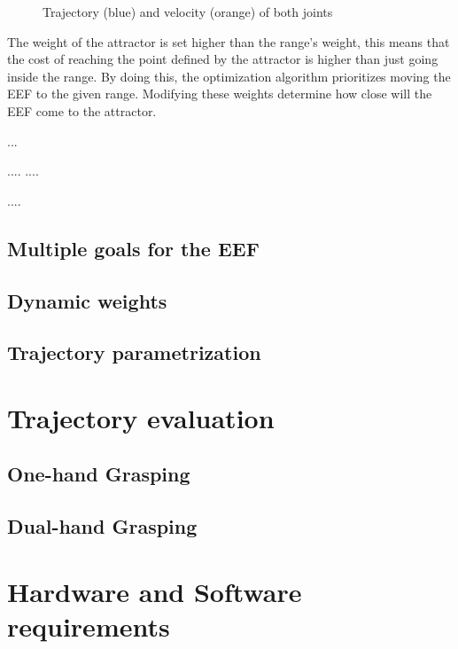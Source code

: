 \begin{figure}[H]
	\centering
	\begin{subfigure}[][Joint $q_{0}$]
		{\texttt{[image: controllers/range\_q0.png]}}
	\end{subfigure}
	\begin{subfigure}[][Joint $q_{1}$]
		{\texttt{[image: controllers/range\_q1.png]}}
	\end{subfigure}
	\vspace{-12pt}
	\caption[Position range with attractor: Joints]{Trajectory (blue) and velocity (orange) of both joints}
	\vspace{-10pt}
	\label{fig:range_q1}
\end{figure}
The weight of the attractor is set higher than the range's weight, this means that the cost of reaching the point defined by the attractor is higher than just going inside the range. By doing this, the optimization algorithm prioritizes moving the EEF to the given range. Modifying these weights determine how close will the EEF come to the attractor.



...

....
....

....

\subsection{Multiple goals for the EEF}
\subsection{Dynamic weights}
\subsection{Trajectory parametrization}
\section{Trajectory evaluation}
\subsection{One-hand Grasping}
\subsection{Dual-hand Grasping}

\section{Hardware and Software requirements}
\label{subsec:software}

